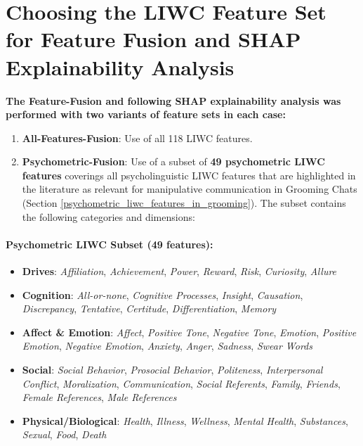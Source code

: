 \section{Choosing the LIWC Feature Set for Feature Fusion and SHAP Explainability Analysis} \label{sec:liwc-feature-selection}



\textbf{The Feature-Fusion and following SHAP explainability analysis was performed with two variants of feature sets in each case: }
\begin{enumerate}
    \item \textbf{All-Features-Fusion}: Use of all 118 LIWC features.
    \item \textbf{Psychometric-Fusion}: Use of a subset of \textbf{49 psychometric LIWC features} coverings all psycholinguistic LIWC features that are highlighted in the literature as relevant for manipulative communication in Grooming Chats (Section \ref{psychometric_liwc_features_in_grooming}). The subset contains the following categories and dimensions:
\end{enumerate}

\paragraph{Psychometric LIWC Subset (49 features):}
\begin{itemize}
  \item \textbf{Drives}: \textit{Affiliation}, \textit{Achievement}, \textit{Power}, \textit{Reward}, \textit{Risk}, \textit{Curiosity}, \textit{Allure}
  \item \textbf{Cognition}: \textit{All-or-none}, \textit{Cognitive Processes}, \textit{Insight}, \textit{Causation}, \textit{Discrepancy}, \textit{Tentative}, \textit{Certitude}, \textit{Differentiation}, \textit{Memory}
  \item \textbf{Affect \& Emotion}: \textit{Affect}, \textit{Positive Tone}, \textit{Negative Tone}, \textit{Emotion}, \textit{Positive Emotion}, \textit{Negative Emotion}, \textit{Anxiety}, \textit{Anger}, \textit{Sadness}, \textit{Swear Words}
  \item \textbf{Social}: \textit{Social Behavior}, \textit{Prosocial Behavior}, \textit{Politeness}, \textit{Interpersonal Conflict}, \textit{Moralization}, \textit{Communication}, \textit{Social Referents}, \textit{Family}, \textit{Friends}, \textit{Female References}, \textit{Male References}
  \item \textbf{Physical/Biological}: \textit{Health}, \textit{Illness}, \textit{Wellness}, \textit{Mental Health}, \textit{Substances}, \textit{Sexual}, \textit{Food}, \textit{Death}
\end{itemize}

